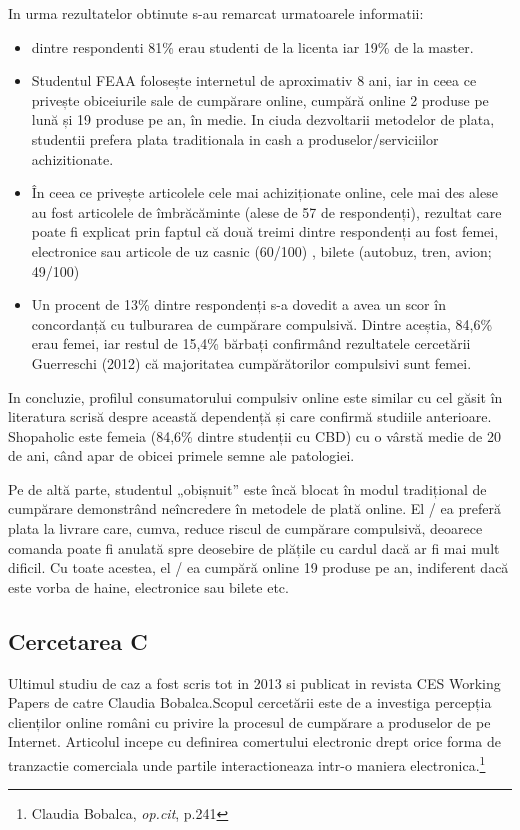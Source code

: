 \documentclass[a4paper, 12pt]{article}
\begin{document}
	\qquad In urma rezultatelor obtinute s-au remarcat urmatoarele informatii: 
		\begin{itemize}
	\item dintre respondenti 81\% erau studenti de la licenta iar 19\% de la master. 
	\item Studentul FEAA folosește internetul de aproximativ 8 ani, iar in ceea ce privește obiceiurile sale de cumpărare online, cumpără online 2 produse pe lună și 19 produse pe an, în medie. In ciuda dezvoltarii metodelor de plata, studentii prefera plata traditionala in cash a produselor/serviciilor achizitionate.
	 \item În ceea ce privește articolele cele mai achiziționate online, cele mai des alese au fost articolele de îmbrăcăminte (alese de 57 de respondenți), rezultat care poate fi explicat prin faptul că două treimi dintre respondenți au fost femei, electronice sau articole de uz casnic (60/100) , bilete (autobuz, tren, avion; 49/100)
	\item Un procent de 13\% dintre respondenți s-a dovedit a avea un scor în concordanță cu tulburarea de cumpărare compulsivă. Dintre aceștia, 84,6\% erau femei, iar restul de 15,4\% bărbați confirmând rezultatele cercetării Guerreschi (2012) că majoritatea cumpărătorilor compulsivi sunt femei.
\end{itemize}
		\qquad In concluzie, profilul consumatorului compulsiv online este similar cu cel găsit în literatura scrisă despre această dependență și care confirmă studiile anterioare. Shopaholic este femeia (84,6\% dintre studenții cu CBD) cu o vârstă medie de 20 de ani, când apar de obicei primele semne ale patologiei.
		
		\quad Pe de altă parte, studentul „obișnuit” este încă blocat în modul tradițional de cumpărare demonstrând neîncredere în metodele de plată online. El / ea preferă plata la livrare care, cumva,  reduce riscul de cumpărare compulsivă, deoarece comanda poate fi anulată spre deosebire de plățile cu cardul dacă ar fi mai mult dificil. Cu toate acestea, el / ea cumpără online 19 produse pe an, indiferent dacă este vorba de haine, electronice sau bilete etc.
		\subsection{Cercetarea C}
		\qquad Ultimul studiu de caz  a fost scris tot in 2013 si publicat in revista CES Working Papers de catre Claudia Bobalca.Scopul cercetării este de a investiga percepția clienților online români cu privire la procesul de cumpărare a produselor de pe Internet. Articolul incepe cu definirea comertului electronic drept orice forma de tranzactie comerciala unde partile interactioneaza intr-o maniera electronica.\footnote{Claudia Bobalca, \textit{op.cit}, p.241}
		
\end{document}
